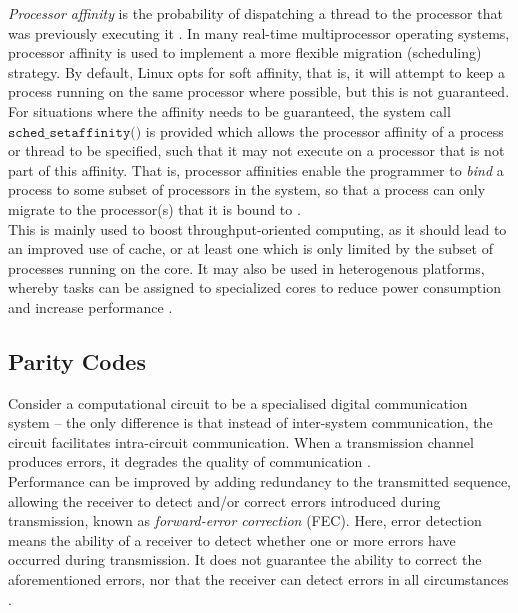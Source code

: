 \noindent \emph{Processor affinity} is the probability of dispatching a thread to the processor that was previously executing it 
\cite{ibm}. In many real-time multiprocessor operating systems, processor affinity is used to implement a more flexible migration 
(scheduling) strategy. By default, Linux opts for soft affinity, that is, it will attempt to keep a process running on the same processor 
where possible, but this is not guaranteed. For situations where the affinity needs to be guaranteed, the system call 
$\texttt{sched\_setaffinity()}$ is provided which allows the processor affinity of a process or thread to be specified, such that it may 
not execute on a processor that is not part of this affinity. That is, processor affinities enable the programmer to \emph{bind} a 
process to some subset of processors in the system, so that a process can only migrate to the processor(s) that it is bound to 
\cite{gujarati2015multiprocessor}. \\

\noindent This is mainly used to boost throughput-oriented computing, as it should lead to an improved use of cache, or at least one which 
is only limited by the subset of processes running on the core. It may also be used in heterogenous platforms, whereby tasks can be 
assigned to specialized cores to reduce power consumption and increase performance \cite{gujarati2015multiprocessor}.

\subsection{Parity Codes}
\label{sec:bgrw-pc}

\noindent Consider a computational circuit to be a specialised digital communication system -- the only difference is that instead of 
inter-system communication, the circuit facilitates intra-circuit communication. When a transmission channel produces errors, it degrades 
the quality of communication \cite{comms}. \\

\noindent Performance can be improved by adding redundancy to the transmitted sequence, allowing the receiver to detect and/or correct 
errors introduced during transmission, known as \emph{forward-error correction} (FEC). Here, error detection means the ability of a 
receiver to detect whether one or more errors have occurred during transmission. It does not guarantee the ability to correct the 
aforementioned errors, nor that the receiver can detect errors in all circumstances \cite{comms}. \\

